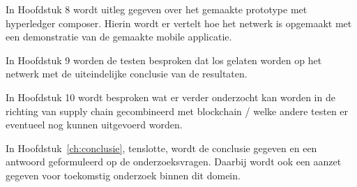 In Hoofdstuk 8 wordt uitleg gegeven over het gemaakte prototype met hyperledger composer. Hierin wordt er vertelt hoe het netwerk is opgemaakt met een demonstratie van de gemaakte mobile applicatie.

In Hoofdstuk 9 worden de testen besproken dat los gelaten worden op het netwerk met de uiteindelijke conclusie van de resultaten.

In Hoofdstuk 10 wordt besproken wat er verder onderzocht kan worden in de richting van supply chain gecombineerd met blockchain / welke andere testen er eventueel nog kunnen uitgevoerd worden.

In Hoofdstuk~\ref{ch:conclusie}, tenslotte, wordt de conclusie gegeven en een antwoord geformuleerd op de onderzoeksvragen. Daarbij wordt ook een aanzet gegeven voor toekomstig onderzoek binnen dit domein.

